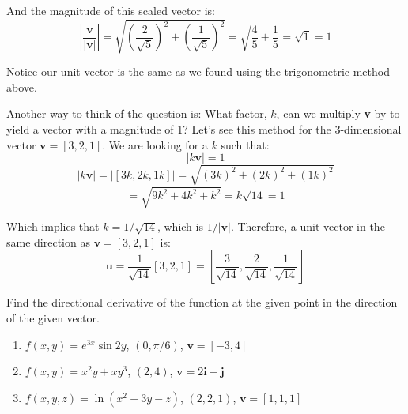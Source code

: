 And the magnitude of this scaled vector is:
$$ \left| \frac{\textbf{v}}{| \textbf{v} |} \right| = \sqrt{\left( \frac{2}{\sqrt{5}} \right)^2 + \left( \frac{1}{\sqrt{5}} \right)^2} = \sqrt{\frac{4}{5} + \frac{1}{5}} = \sqrt{1} = 1$$

Notice our unit vector is the same as we found using the trigonometric method above. 

Another way to think of the question is: What factor, $k$, can we multiply \textbf{v} by to yield a vector with a magnitude of 1? Let's see this method for the 3-dimensional vector $\textbf{v} = \left[ 3, 2, 1 \right]$. We are looking for a $k$ such that:
$$|k\textbf{v}| = 1$$
$$|k \textbf{v}| = \left| \left[ 3k, 2k, 1k \right] \right| = \sqrt{\left( 3k \right)^2 + \left( 2k \right)^2 + \left( 1k \right)^2}$$
$$= \sqrt{9k^2 + 4k^2 + k^2} = k\sqrt{14} = 1$$

Which implies that $k = 1/\sqrt{14}$, which is $1/|\textbf{v}|$. Therefore, a unit vector in the same direction as $\textbf{v} = \left[ 3, 2, 1 \right]$ is:
$$\textbf{u} = \frac{1}{\sqrt{14}} \left[ 3, 2, 1 \right] = \left[ \frac{3}{\sqrt{14}}, \frac{2}{\sqrt{14}}, \frac{1}{\sqrt{14}} \right]$$


\begin{Exercise}[title = {Finding Directional Derivatives}, label = direction]
Find the directional derivative of the function at the given point in the 
direction of the given vector. 
\begin{enumerate}
    \item $f(x, y) = e^{3x} \sin{2y}$, $(0, \pi/6)$, $\textbf{v} = \left[ -3, 
    4 \right]$
    \item $f(x, y) = x^2y + xy^3$, $(2, 4)$, $\textbf{v} = 2 \textbf{i} - 
    \textbf{j}$
    \item $f(x, y, z) = \ln{ \left( x^2 + 3y - z \right)}$, $(2, 2, 1)$, 
    $\textbf{v} = \left[ 1, 1, 1 \right]$
\end{enumerate}
\vspace{100mm}
\end{Exercise}

